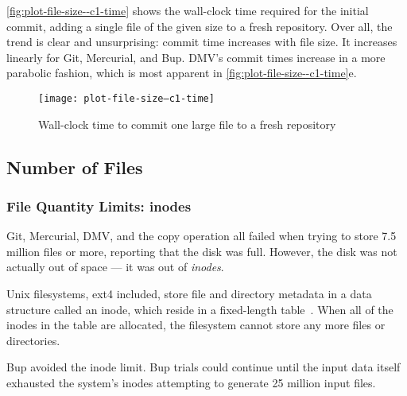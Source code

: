 
\autoref{fig:plot-file-size--c1-time} shows the wall-clock time required for the initial \gls{commit}, adding a single file of the given size to a fresh \gls{repository}.
Over all, the trend is clear and unsurprising: \gls{commit} time increases with file size.
It increases linearly for Git, Mercurial, and Bup.
DMV's commit times increase in a more parabolic fashion, which is most apparent in \autoref{fig:plot-file-size--c1-time}e.

\begin{figure}[]
    \caption{Wall-clock time to commit one large file to a fresh repository}
    \label{fig:plot-file-size--c1-time}
    \centering
    \texttt{[image: plot-file-size--c1-time]}
\end{figure}

%



\subsection{Number of Files}

\subsubsection{File Quantity Limits: inodes}


Git, Mercurial, DMV, and the copy operation all failed when trying to store \num{7.5} million files or more, reporting that the disk was full.
However, the disk was not actually out of space --- it was out of \emph{\glspl{inode}}.


Unix filesystems, ext4 included, store file and directory metadata in a data structure called an \gls{inode}, which reside in a fixed-length table~\cite{unix_timesharing_system}.
When all of the \glspl{inode} in the table are allocated, the filesystem cannot store any more files or directories.

Bup avoided the \gls{inode} limit.
Bup trials could continue until the input data itself exhausted the system's \glspl{inode} attempting to generate \num{25} million input files.


